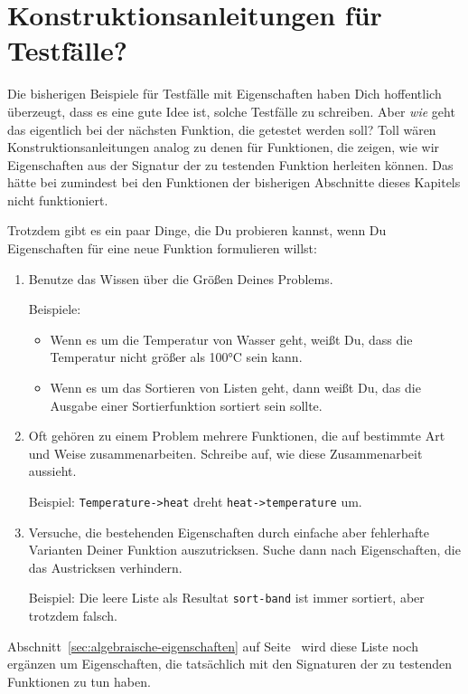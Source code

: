 
\section{Konstruktionsanleitungen für Testfälle?}
\label{sec:ka-testfaelle}

Die bisherigen Beispiele für Testfälle mit Eigenschaften haben Dich
hoffentlich überzeugt, dass es eine gute Idee ist, solche Testfälle zu
schreiben.  Aber \emph{wie} geht das eigentlich bei der nächsten
Funktion, die getestet werden soll?  Toll wären
Konstruktionsanleitungen analog zu denen für Funktionen, die zeigen,
wie wir Eigenschaften aus der Signatur der zu testenden Funktion
herleiten können.  Das hätte bei zumindest bei den Funktionen der
bisherigen Abschnitte dieses Kapitels nicht funktioniert.

Trotzdem gibt es ein paar Dinge, die Du probieren kannst, wenn Du
Eigenschaften für eine neue Funktion formulieren willst:
%
\begin{enumerate}
\item Benutze das Wissen über die Größen Deines Problems.

  Beispiele:

  \begin{itemize}
    \item Wenn es um die Temperatur von Wasser geht, weißt Du,
    dass die Temperatur nicht größer als 100\si{\degree}C sein kann.
  \item Wenn es um das Sortieren von Listen geht, dann weißt Du, das
    die Ausgabe einer Sortierfunktion sortiert sein sollte.
  \end{itemize}
\item Oft gehören zu einem Problem mehrere Funktionen, die auf
  bestimmte Art und Weise zusammenarbeiten.  Schreibe auf, wie diese
  Zusammenarbeit aussieht.

  Beispiel: \lstinline{Temperature->heat} dreht
  \lstinline{heat->temperature} um.
\item Versuche, die bestehenden Eigenschaften durch einfache aber
  fehlerhafte Varianten Deiner Funktion auszutricksen.
  Suche dann nach
  Eigenschaften, die das Austricksen verhindern.

  Beispiel: Die leere Liste als Resultat \lstinline{sort-band} ist
  immer sortiert, aber trotzdem falsch.
\end{enumerate}
%
Abschnitt~\ref{sec:algebraische-eigenschaften} auf
Seite~\pageref{sec:algebraische-eigenschaften} wird diese Liste noch
ergänzen um Eigenschaften, die tatsächlich mit den Signaturen der zu
testenden Funktionen zu tun haben.

